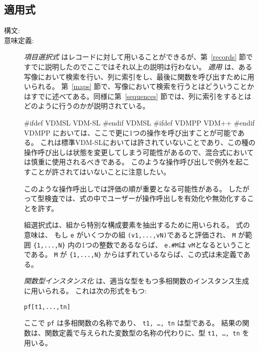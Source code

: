 \documentclass[\pformat,12pt]{jarticle}
\newcommand{\vdmslpp}[2]{%
#ifdef VDMSL
#1
#endif VDMSL
#ifdef VDMPP
#2
#endif VDMPP
}
\newcommand{\vdmpp}{VDM++}
\begin{document}
\subsection{適用式}\label{app-expr}

\begin{description}
\item[構文:]





\item[意味定義:] 
  {\it 項目選択式} はレコードに対して用いることができるが、第~\ref{records} 節ですでに説明したのでここではそれ以上の説明は行わない。
 {\it 適用} は、ある写像において検索を行い、列に索引をし、最後に関数を呼び出すために用いられる。
第~\ref{maps} 節で、写像において検索を行うとはどういうことかはすでに述べてある。同様に第~\ref{sequences} 節では、列に索引をするとはどのように行うのかが説明されている。

 \vdmslpp{VDM-SL}{\vdmpp}においては、ここで更に1つの操作を呼び出すことが可能である。
これは標準VDM-SLにおいては許されていないことであり、この種の操作呼び出しは状態を変更してしまう可能性があるので、混合式においては慎重に使用されるべきである。
このような操作呼び出しで例外を起こすことが許されてはいないことに注意したい。

 このような操作呼出しでは評価の順が重要となる可能性がある。
したがって型検査では、式の中でユーザーが操作呼出しを有効化や無効化することを許す。

 組選択式は、組から特別な構成要素を抽出するために用いられる。
式の意味は、 もし \texttt{e} がいくつかの組 \texttt{(v1,...,vN)}であると評価され、 \texttt{M} が範囲 \verb+{1,...,N}+ 内の1つの整数であるならば、 \texttt{e.\#M}は \texttt{vM}となるということである。
\texttt{M} が \verb+{1,...,N}+ からはずれているならば、この式は未定義である。

 {\it 関数型インスタンス化\/} は、適当な型をもつ多相関数のインスタンス生成に用いられる。
これは次の形式をもつ:
  \begin{alltt}
    pf [ t1, ..., tn ]
  \end{alltt}
 ここで {\tt pf} は多相関数の名称であり、 {\tt t1,  \ldots, tn} は型である。
結果の関数は、関数定義で与えられた変数型の名称の代わりに、型 {\tt  t1, \ldots, tn} を用いる。


\end{description}
\end{document}
